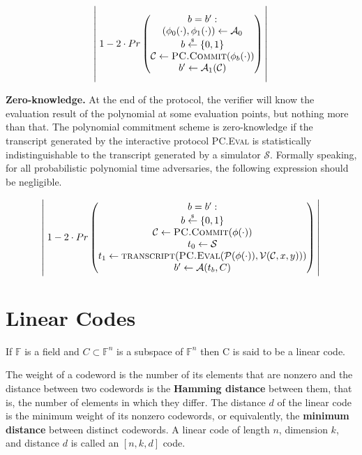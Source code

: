 $$
\left|\rule{0cm}{1.5cm}\right.
1 - 2 \cdot Pr
\begin{pmatrix}
 b = b^\prime : \\
 (\phi_0(\cdot), \phi_1(\cdot)) \leftarrow \mathcal{A}_0 \\
 b \overset{{\scriptscriptstyle\$}}{\leftarrow} \{0, 1\} \\
 \mathcal{C} \leftarrow \textsc{PC.Commit}(\phi_b(\cdot)) \\
 b^\prime \leftarrow \mathcal{A}_1(\mathcal{C})
\end{pmatrix}
\left|\rule{0cm}{1.5cm}\right.
$$


\textbf{Zero-knowledge.} At the end of the protocol, the verifier will know the evaluation result of the polynomial at some evaluation points, but nothing more than that. The polynomial commitment scheme is zero-knowledge if the transcript generated by the interactive protocol \textsc{PC.Eval} is statistically indistinguishable to the transcript generated by a simulator $\mathcal{S}$. Formally speaking, for all probabilistic polynomial time adversaries, the following expression should be negligible.

$$
\left|\rule{0cm}{1.5cm}\right.
1 - 2 \cdot Pr
\begin{pmatrix}
 b = b^\prime : \\
 b \overset{{\scriptscriptstyle\$}}{\leftarrow} \{0, 1\} \\
 \mathcal{C} \leftarrow \textsc{PC.Commit}(\phi(\cdot)) \\
 t_0 \leftarrow \mathcal{S} \\
 t_1 \leftarrow \textsc{transcript}(\textsc{PC.Eval}(\mathcal{P}(\phi(\cdot)), \mathcal{V}(\mathcal{C}, x, y))) \\
 b^\prime \leftarrow \mathcal{A}(t_b, C)
\end{pmatrix}
\left|\rule{0cm}{1.5cm}\right.
$$

\section{Linear Codes}

\begin{definition}
If $\mathbb{F}$ is a field and $C \subset \mathbb{F}^n$ is a subspace of $\mathbb{F}^n$ then C is said to be a linear code.
\end{definition}

The weight of a codeword is the number of its elements that are nonzero and the distance between two codewords is the \textbf{Hamming distance} between them, that is, the number of elements in which they differ. The distance $d$ of the linear code is the minimum weight of its nonzero codewords, or equivalently, the \textbf{minimum distance} between distinct codewords. A linear code of length $n$, dimension $k$, and distance $d$ is called an $[n,k,d]$ code.

